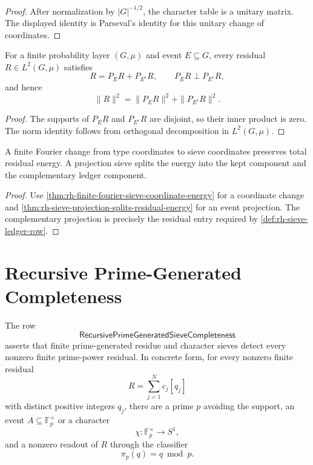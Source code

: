 \begin{proof}
After normalization by $|G|^{-1/2}$, the character table is a unitary
matrix.  The displayed identity is Parseval's identity for this unitary
change of coordinates.
\end{proof}

\begin{theorem}
\label{thm:rh-sieve-projection-splits-residual-energy}
For a finite probability layer $(G,\mu)$ and event $E\subseteq G$,
every residual $R\in L^2(G,\mu)$ satisfies
$$
R=P_ER+P_{E^c}R,
\qquad
P_ER\perp P_{E^c}R,
$$
and hence
$$
\|R\|^2=\|P_ER\|^2+\|P_{E^c}R\|^2.
$$
\end{theorem}

\begin{proof}
The supports of $P_ER$ and $P_{E^c}R$ are disjoint, so their inner
product is zero.  The norm identity follows from orthogonal
decomposition in $L^2(G,\mu)$.
\end{proof}

\begin{corollary}
\label{cor:rh-sieve-transformations-preserve-or-ledger-energy}
A finite Fourier change from type coordinates to sieve coordinates
preserves total residual energy.  A projection sieve splits the energy
into the kept component and the complementary ledger component.
\end{corollary}

\begin{proof}
Use \autoref{thm:rh-finite-fourier-sieve-coordinate-energy} for a
coordinate change and
\autoref{thm:rh-sieve-projection-splits-residual-energy} for an event
projection.  The complementary projection is precisely the residual
entry required by \autoref{def:rh-sieve-ledger-row}.
\end{proof}

\section{Recursive Prime-Generated Completeness}
\label{sec:rh-prime-sieve-tower-recursive-completeness}

\begin{definition}[RecursivePrimeGeneratedSieveCompleteness]
\label{def:rh-recursive-prime-generated-sieve-completeness}
The row
$$
\mathsf{RecursivePrimeGeneratedSieveCompleteness}
$$
asserts that finite prime-generated residue and character sieves detect
every nonzero finite prime-power residual.  In concrete form, for every
nonzero finite residual
$$
R=\sum_{j=1}^{N}c_j[q_j]
$$
with distinct positive integers $q_j$, there are a prime $p$ avoiding
the support, an event $A\subseteq\mathbb F_p^\times$ or a character
$$
\chi:\mathbb F_p^\times\to S^1,
$$
and a nonzero readout of $R$ through the classifier
$$
\pi_p(q)=q\bmod p.
$$
\end{definition}


